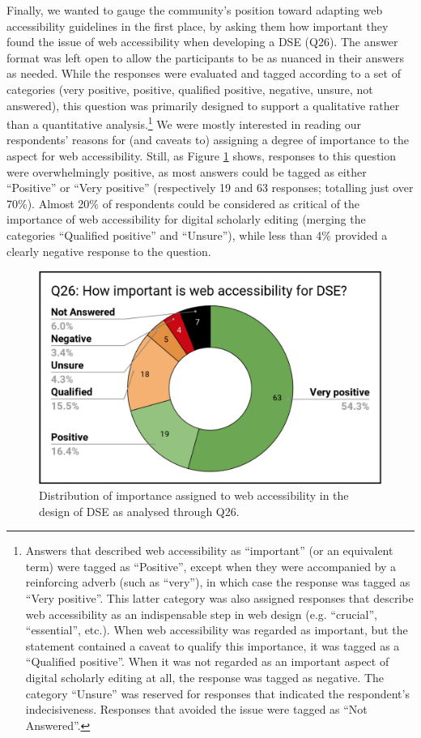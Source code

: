 \begin{paper}
Finally, we wanted to gauge the community's position toward adapting web
accessibility guidelines in the first place, by asking them how
important they found the issue of web accessibility when developing a
DSE (Q26). The answer format was left open to allow the participants to
be as nuanced in their answers as needed. While the responses were
evaluated and tagged according to a set of categories (very positive,
positive, qualified positive, negative, unsure, not answered), this
question was primarily designed to support a qualitative rather than a
quantitative analysis.\footnote{Answers that described web accessibility
  as ``important'' (or an equivalent term) were tagged as ``Positive'',
  except when they were accompanied by a reinforcing adverb (such as
  ``very''), in which case the response was tagged as ``Very positive''.
  This latter category was also assigned responses that describe web
  accessibility as an indispensable step in web design (e.g.
  ``crucial'', ``essential'', etc.). When web accessibility was regarded
  as important, but the statement contained a caveat to qualify this
  importance, it was tagged as a ``Qualified positive''. When it was not
  regarded as an important aspect of digital scholarly editing at all,
  the response was tagged as negative. The category ``Unsure'' was
  reserved for responses that indicated the respondent's indecisiveness.
  Responses that avoided the issue were tagged as ``Not Answered''.} We
were mostly interested in reading our respondents' reasons for (and
caveats to) assigning a degree of importance to the aspect for web
accessibility. Still, as Figure \ref{q26} shows, responses to this question were
overwhelmingly positive, as most answers could be tagged as either
``Positive'' or ``Very positive'' (respectively 19 and 63 responses;
totalling just over 70\%). Almost 20\% of respondents could be
considered as critical of the importance of web accessibility for
digital scholarly editing (merging the categories ``Qualified positive''
and ``Unsure''), while less than 4\% provided a clearly negative
response to the question.

\begin{figure}[t]
\includegraphics[width=\textwidth]{media/martinez5.png}
\caption{Distribution of importance assigned to web accessibility
in the design of DSE as analysed through Q26.}
\label{q26}
\end{figure}


\end{paper}
